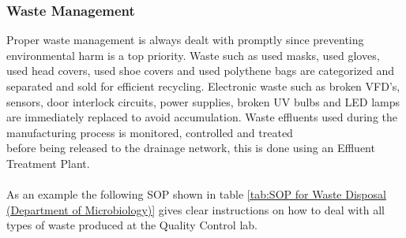 \documentclass[a4paper,12pt]{article}
\begin{document}
			\subsubsection{Waste Management}
				Proper waste management is always dealt with promptly since preventing environmental harm is a top priority.
				Waste such as used masks, used gloves, used head covers, used shoe covers and used polythene bags are categorized and separated and sold for efficient recycling.
				Electronic waste such as broken VFD's, sensors, door interlock circuits, power supplies, broken UV bulbs and LED lamps are immediately replaced to avoid accumulation. 
				Waste effluents used during the manufacturing process is monitored, controlled and treated \\
				before being released to the drainage network, this is done using an Effluent Treatment Plant.\\
				\\
				As an example the following SOP shown in table \ref{tab:SOP for Waste Disposal (Department of Microbiology)} gives clear instructions on how to deal with all types of waste produced at the Quality Control lab. \\
				  
\end{document}
